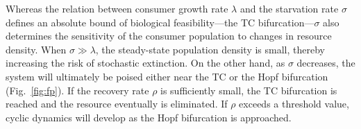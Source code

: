 \documentclass{pnastwo}
\begin{document}
\begin{article}
Whereas the relation between consumer growth rate $\lambda$ and the starvation rate $\sigma$ defines an absolute bound of biological feasibility---the TC bifurcation---$\sigma$ also determines the sensitivity of the consumer population to changes in resource density.
When $\sigma\gg\lambda$, the steady-state population density is small, thereby increasing the risk of stochastic extinction.
On the other hand, as $\sigma$ decreases, the system will ultimately be poised either near the TC or the Hopf bifurcation (Fig.~\ref{fig:fp}).
If the recovery rate $\rho$ is sufficiently small, the TC bifurcation is reached and the resource eventually is eliminated.
If $\rho$ exceeds a threshold value, cyclic dynamics will develop as the Hopf bifurcation is approached.
\\

%




\end{article}
\end{document}
